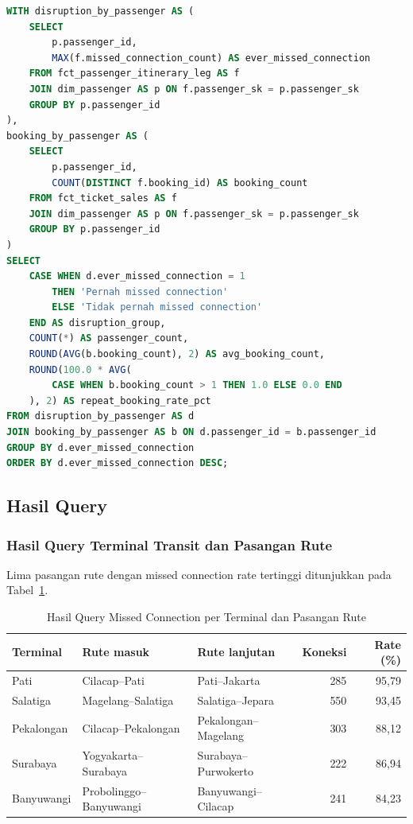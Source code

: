 \begin{lstlisting}[language=SQL]
WITH disruption_by_passenger AS (
    SELECT
        p.passenger_id,
        MAX(f.missed_connection_count) AS ever_missed_connection
    FROM fct_passenger_itinerary_leg AS f
    JOIN dim_passenger AS p ON f.passenger_sk = p.passenger_sk
    GROUP BY p.passenger_id
),
booking_by_passenger AS (
    SELECT
        p.passenger_id,
        COUNT(DISTINCT f.booking_id) AS booking_count
    FROM fct_ticket_sales AS f
    JOIN dim_passenger AS p ON f.passenger_sk = p.passenger_sk
    GROUP BY p.passenger_id
)
SELECT
    CASE WHEN d.ever_missed_connection = 1
        THEN 'Pernah missed connection'
        ELSE 'Tidak pernah missed connection'
    END AS disruption_group,
    COUNT(*) AS passenger_count,
    ROUND(AVG(b.booking_count), 2) AS avg_booking_count,
    ROUND(100.0 * AVG(
        CASE WHEN b.booking_count > 1 THEN 1.0 ELSE 0.0 END
    ), 2) AS repeat_booking_rate_pct
FROM disruption_by_passenger AS d
JOIN booking_by_passenger AS b ON d.passenger_id = b.passenger_id
GROUP BY d.ever_missed_connection
ORDER BY d.ever_missed_connection DESC;
\end{lstlisting}

\subsection{Hasil Query}
\subsubsection{Hasil Query Terminal Transit dan Pasangan Rute}

Lima pasangan rute dengan missed connection rate tertinggi ditunjukkan pada
Tabel~\ref{tab:hasil-bq1}.

\begin{table}[htbp]
\centering
\scriptsize
\caption{Hasil Query Missed Connection per Terminal dan Pasangan Rute}
\label{tab:hasil-bq1}
\begin{tabular}{|l|l|l|r|r|}
\hline
\textbf{Terminal} & \textbf{Rute masuk} & \textbf{Rute lanjutan} &
\textbf{Koneksi} & \textbf{Rate (\%)} \\
\hline
Pati & Cilacap--Pati & Pati--Jakarta & 285 & 95,79 \\
Salatiga & Magelang--Salatiga & Salatiga--Jepara & 550 & 93,45 \\
Pekalongan & Cilacap--Pekalongan & Pekalongan--Magelang & 303 & 88,12 \\
Surabaya & Yogyakarta--Surabaya & Surabaya--Purwokerto & 222 & 86,94 \\
Banyuwangi & Probolinggo--Banyuwangi & Banyuwangi--Cilacap & 241 & 84,23 \\
\hline
\end{tabular}
\end{table}

